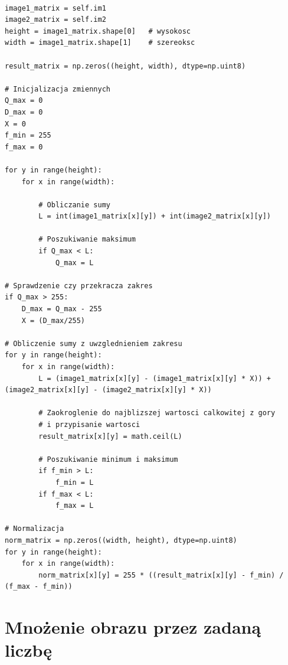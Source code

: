 \documentclass[final,a4paper,openany,12pt]{mwbk}
\begin{document}
\begin{lstlisting}[caption=Sumowanie obrazów szarych]

image1_matrix = self.im1
image2_matrix = self.im2
height = image1_matrix.shape[0]   # wysokosc
width = image1_matrix.shape[1]    # szereoksc

result_matrix = np.zeros((height, width), dtype=np.uint8)

# Inicjalizacja zmiennych
Q_max = 0
D_max = 0
X = 0
f_min = 255
f_max = 0

for y in range(height):
    for x in range(width):  

        # Obliczanie sumy
        L = int(image1_matrix[x][y]) + int(image2_matrix[x][y])

        # Poszukiwanie maksimum
        if Q_max < L:
            Q_max = L

# Sprawdzenie czy przekracza zakres
if Q_max > 255:
    D_max = Q_max - 255
    X = (D_max/255)

# Obliczenie sumy z uwzglednieniem zakresu
for y in range(height):
    for x in range(width): 
        L = (image1_matrix[x][y] - (image1_matrix[x][y] * X)) + (image2_matrix[x][y] - (image2_matrix[x][y] * X))

        # Zaokroglenie do najblizszej wartosci calkowitej z gory
        # i przypisanie wartosci
        result_matrix[x][y] = math.ceil(L)
        
        # Poszukiwanie minimum i maksimum
        if f_min > L:
            f_min = L
        if f_max < L:
            f_max = L

# Normalizacja
norm_matrix = np.zeros((width, height), dtype=np.uint8)
for y in range(height):
    for x in range(width):
        norm_matrix[x][y] = 255 * ((result_matrix[x][y] - f_min) / (f_max - f_min))
\end{lstlisting}

\section {Mnożenie obrazu przez zadaną liczbę}
\hfill
\\\\
\indent
\end{document}
